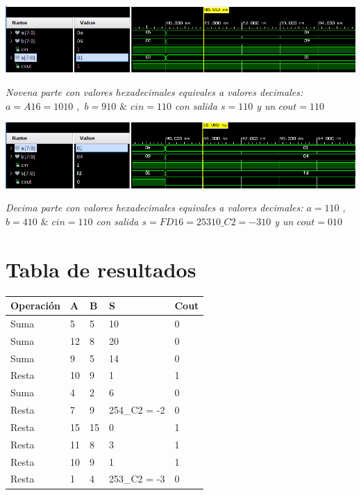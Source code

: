 \documentclass[12pt,executivepaper]{article}
\begin{document}
\begin{flushleft}
	\includegraphics[scale=0.52]{imgs/novena.png}
\end{flushleft}
\begin{center}
    \textit{Novena parte con valores hexadecimales equivales a valores decimales: $a=A{\scriptscriptstyle16}=10{\scriptscriptstyle10}$ $,$ $b=9{\scriptscriptstyle10}$ $\&$ $cin=1{\scriptscriptstyle10}$ con salida $s =1{\scriptscriptstyle10}$ y un $cout=1{\scriptscriptstyle10}$}
\end{center}

\begin{flushleft}
	\includegraphics[scale=0.52]{imgs/decima.png}
\end{flushleft}
\begin{center}
    \textit{Decima parte con valores hexadecimales equivales a valores decimales: $a=1{\scriptscriptstyle10}$ $,$ $b=4{\scriptscriptstyle10}$ $\&$ $cin=1{\scriptscriptstyle10}$ con salida $s =FD{\scriptscriptstyle16}=253{\scriptscriptstyle10\_C2}=-3{\scriptscriptstyle10}$ y un $cout=0{\scriptscriptstyle10}$}
\end{center}
\section{Tabla de resultados}
\begin{center}
    \begin{tabular}{|p{2cm}|p{2cm}|p{2cm}|p{3cm}|p{2cm}|}
    \hline
    Operación & A & B & S & Cout \\\hline
    Suma & 5 & 5 & 10 & 0\\\hline
    Suma & 12 & 8 & 20 &0 \\\hline
    Suma & 9 & 5 & 14 & 0 \\\hline
    Resta & 10 & 9 & 1 & 1 \\\hline
    Suma & 4 & 2 & 6 & 0 \\\hline
    Resta & 7 & 9 & 254\_C2 = -2 & 0 \\\hline
    Resta & 15 & 15 & 0 & 1 \\\hline
    Resta & 11 & 8 & 3 & 1 \\\hline
    Resta & 10 & 9 & 1 & 1 \\\hline
    Resta & 1 & 4 & 253\_C2 = -3 & 0 \\\hline
    \end{tabular}
\end{center}
\clearpage
\end{document}
